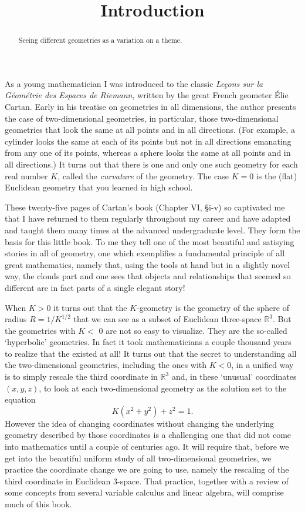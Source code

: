 \documentclass{ximera}
\title{Introduction}
\begin{document}
\begin{abstract}
Seeing different geometries as a variation on a theme.
\end{abstract}
\maketitle

As a young mathematician I was introduced to the classic \textit{Le\c{c}ons
sur la G\'{e}om\'{e}trie des Espaces de Riemann}, written by the great French
geometer \'{E}lie Cartan. Early in his treatise on geometries in all
dimensions, the author presents the case of two-dimensional geometries, in
particular, those two-dimensional geometries that look the same at all points
and in all directions. (For example, a cylinder looks the same at each of its
points but not in all directions emanating from any one of its points, whereas
a sphere looks the same at all points and in all directions.) It turns out
that there is one and only one such geometry for each real number $K$, called
the \textit{curvature} of the geometry. The case $K=0$ is the (flat) Euclidean
geometry that you learned in high school.

These twenty-five pages of Cartan's book (Chapter VI, \S i-v) so captivated me
that I have returned to them regularly throughout my career and have adapted
and taught them many times at the advanced undergraduate level. They form the
basis for this little book. To me they tell one of the most beautiful and
satisying stories in all of geometry, one which exemplifies a fundamental
principle of all great mathematics, namely that, using the tools at hand but
in a slightly novel way, the clouds part and one sees that objects and
relationships that seemed so different are in fact parts of a single elegant story!

When $K>0$ it turns out that the $K$-geometry is the geometry of the sphere of
radius $R=1/K^{1/2}$ that we can see as a subset of Euclidean three-space
$\mathbb{R}^{3}$. But the geometries with $K<$ $0$ are not so easy to
visualize. They are the so-called `hyperbolic' geometries. In fact it took
mathematicians a couple thousand years to realize that the existed at all! It
turns out that the secret to understanding all the two-dimensional geometries,
including the ones with $K<0$, in a unified way is to simply rescale the third
coordinate in $\mathbb{R}^{3}$ and, in these `unusual' coordinates $\left(
x,y,z\right)  $, to look at each two-dimensional geometry as the solution set
to the equation%
\[
K\left(  x^{2}+y^{2}\right)  +z^{2}=1.
\]
However the idea of changing coordinates without changing the underlying
geometry described by those coordinates is a challenging one that did not come
into mathematics until a couple of centuries ago. It will require that, before
we get into the beautiful uniform study of all two-dimensional geometries, we
practice the coordinate change we are going to use, namely the rescaling of
the third coordinate in Euclidean $3$-space. That practice, together with a
review of some concepts from several variable calculus and linear algebra,
will comprise much of this book.
\end{document}
